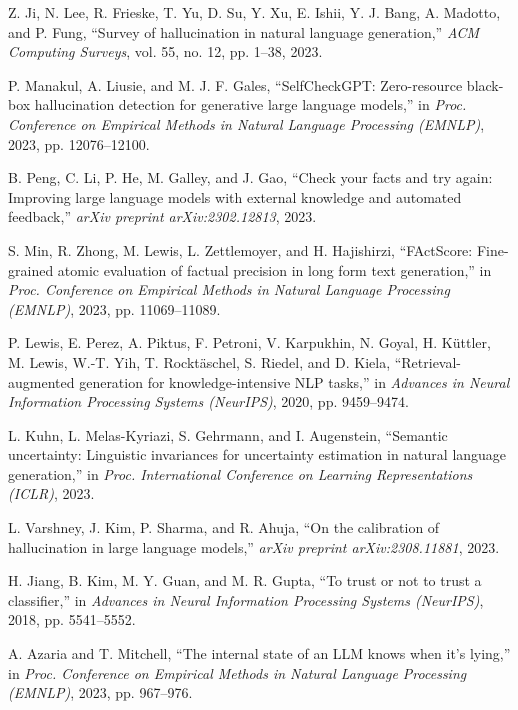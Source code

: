 \documentclass[11pt]{article}
\begin{document}

\begin{thebibliography}{99}

Z. Ji, N. Lee, R. Frieske, T. Yu, D. Su, Y. Xu, E. Ishii, Y. J. Bang, A. Madotto, and P. Fung,
``Survey of hallucination in natural language generation,''
\textit{ACM Computing Surveys}, vol. 55, no. 12, pp. 1--38, 2023.

P. Manakul, A. Liusie, and M. J. F. Gales,
``SelfCheckGPT: Zero-resource black-box hallucination detection for generative large language models,''
in \textit{Proc. Conference on Empirical Methods in Natural Language Processing (EMNLP)}, 2023, pp. 12076--12100.

B. Peng, C. Li, P. He, M. Galley, and J. Gao,
``Check your facts and try again: Improving large language models with external knowledge and automated feedback,''
\textit{arXiv preprint arXiv:2302.12813}, 2023.

S. Min, R. Zhong, M. Lewis, L. Zettlemoyer, and H. Hajishirzi,
``FActScore: Fine-grained atomic evaluation of factual precision in long form text generation,''
in \textit{Proc. Conference on Empirical Methods in Natural Language Processing (EMNLP)}, 2023, pp. 11069--11089.

P. Lewis, E. Perez, A. Piktus, F. Petroni, V. Karpukhin, N. Goyal, H. Küttler, M. Lewis, W.-T. Yih, T. Rocktäschel, S. Riedel, and D. Kiela,
``Retrieval-augmented generation for knowledge-intensive NLP tasks,''
in \textit{Advances in Neural Information Processing Systems (NeurIPS)}, 2020, pp. 9459--9474.

L. Kuhn, L. Melas-Kyriazi, S. Gehrmann, and I. Augenstein,
``Semantic uncertainty: Linguistic invariances for uncertainty estimation in natural language generation,''
in \textit{Proc. International Conference on Learning Representations (ICLR)}, 2023.

L. Varshney, J. Kim, P. Sharma, and R. Ahuja,
``On the calibration of hallucination in large language models,''
\textit{arXiv preprint arXiv:2308.11881}, 2023.

H. Jiang, B. Kim, M. Y. Guan, and M. R. Gupta,
``To trust or not to trust a classifier,''
in \textit{Advances in Neural Information Processing Systems (NeurIPS)}, 2018, pp. 5541--5552.

A. Azaria and T. Mitchell,
``The internal state of an LLM knows when it's lying,''
in \textit{Proc. Conference on Empirical Methods in Natural Language Processing (EMNLP)}, 2023, pp. 967--976.


\end{thebibliography}
\end{document}
